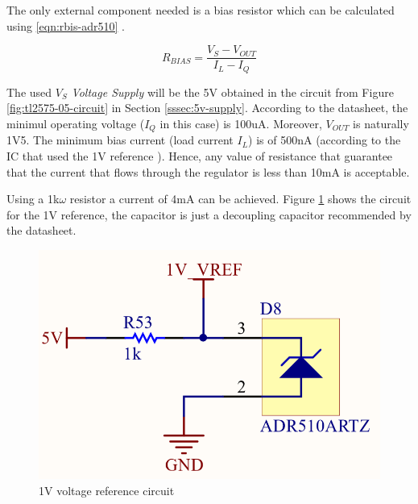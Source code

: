 			The only external component needed is a bias resistor which can be calculated using \ref{eqn:rbis-adr510} \cite{adr510artz-datasheet}.

			\begin{equation}\label{eqn:rbis-adr510}
				R_{BIAS} = \frac{V_{S} - V_{OUT}}{I_{L} - I_{Q}}
			\end{equation}

			The used $V_{S}$ \textit{Voltage Supply} will be the 5V obtained in the circuit from Figure \ref{fig:tl2575-05-circuit} in Section \ref{sssec:5v-supply}. According to the datasheet, the minimul operating voltage ($I_{Q}$ in this case) is 100uA. Moreover, $V_{OUT}$ is naturally 1V5. The minimum bias current (load current $I_{L}$) is of 500nA (according to the IC that used the 1V reference \cite{lm2907-datasheet}). Hence, any value of resistance that guarantee that the current that flows through the regulator is less than 10mA is acceptable.
			\par
			Using a 1k$\omega$ resistor a current of 4mA can be achieved. Figure \ref{fig:ADR510ARTZ-circuit} shows the circuit for the 1V reference, the capacitor is just a decoupling capacitor recommended by the datasheet.

			\begin{figure}[htbp]
				\centering
					\includegraphics[scale=1.2]{figuras/fig-ADR510ARTZ-circuit.png}
				\caption{1V voltage reference circuit \cite{ADR510ARTZ-circuit}}
				\label{fig:ADR510ARTZ-circuit}
			\end{figure}	 

